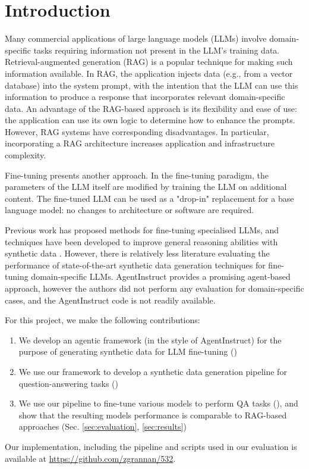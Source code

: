 \section{Introduction}
Many commercial applications of large language models (LLMs) involve
domain-specific tasks requiring information not present in the LLM’s
training data. Retrieval-augmented generation (RAG)
\citep{lewis_retrieval-augmented_2020} is a popular technique for making such
information available. In RAG, the application injects data (e.g., from a
vector database) into the system prompt, with the intention that the LLM can use this
information to produce a response that incorporates relevant domain-specific
data. An advantage of the RAG-based approach is its flexibility and ease of use:
the application can use its own logic to determine how to enhance the prompts.
However, RAG systems have corresponding disadvantages. In particular,
incorporating a RAG architecture increases application and infrastructure
complexity.

Fine-tuning presents another approach. In the fine-tuning paradigm, the
parameters of the LLM itself are modified by training the LLM on additional
content. The fine-tuned LLM can be used as a "drop-in" replacement for a base
language model: no changes to architecture or software are required.

Previous work \citep{balaguer_rag_2024,yang_fingpt_2023,wu_pmc-llama_2023} has
proposed methods for fine-tuning specialised LLMs, and techniques have been
developed to improve general reasoning abilities with synthetic data
\citep{shao_synthetic_2023,wang_self-instruct_2023}. However, there is
relatively less literature evaluating the performance of state-of-the-art
synthetic data generation techniques for fine-tuning domain-specific LLMs.
AgentInstruct \citep{mitra_agentinstruct_2024} provides a promising agent-based
approach, however the authors did not perform any evaluation for domain-specific
cases, and the AgentInstruct code is not readily available.

For this project, we make the following contributions:

\begin{enumerate}
\item We develop an agentic framework (in the style of AgentInstruct) for the purpose
of generating synthetic data for LLM fine-tuning ()
\item We use our framework to develop a synthetic data generation pipeline for question-answering tasks
()
\item We use our pipeline to fine-tune various models to perform QA tasks (), and show that
the resulting models performance is comparable to RAG-based approaches (Sec. \ref{sec:evaluation}, \ref{sec:results})
\end{enumerate}

Our implementation, including the pipeline and scripts used in our
evaluation is available at \url{https://github.com/zgrannan/532}.

